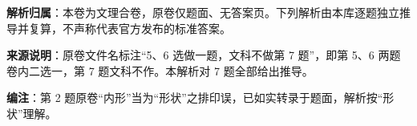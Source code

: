 

\begin{gknotice}
\textbf{解析归属}：本卷为文理合卷，原卷仅题面、无答案页。下列解析由本库逐题独立推导并复算，不声称代表官方发布的标准答案。

\textbf{来源说明}：原卷文件名标注“5、6 选做一题，文科不做第 7 题”，即第 5、6 两题卷内二选一，第 7 题文科不作。本解析对 7 题全部给出推导。

\textbf{编注}：第 2 题原卷“内形”当为“形状”之排印误，已如实转录于题面，解析按“形状”理解。
\end{gknotice}

